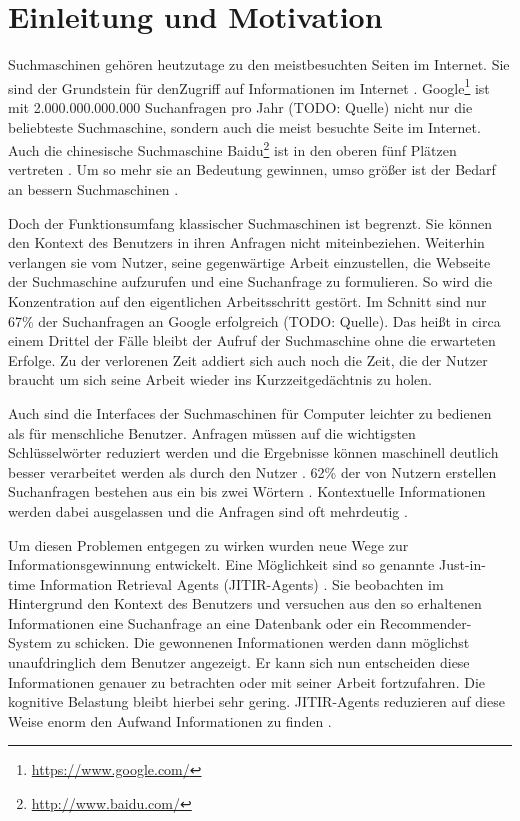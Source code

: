 \section{Einleitung und Motivation}
Suchmaschinen gehören heutzutage zu den meistbesuchten Seiten im Internet. Sie sind der Grundstein für denZugriff auf Informationen im Internet \cite{budzik2000user}. Google\footnote{\url{https://www.google.com/}} ist mit 2.000.000.000.000 Suchanfragen pro Jahr (TODO: Quelle) nicht nur die beliebteste Suchmaschine, sondern auch die meist besuchte Seite im Internet. Auch die chinesische Suchmaschine Baidu\footnote{\url{http://www.baidu.com/}} ist in den oberen fünf Plätzen vertreten \cite{alexa}. Um so mehr sie an Bedeutung gewinnen, umso größer ist der Bedarf an bessern Suchmaschinen \cite{lawrence2000context}.

Doch der Funktionsumfang klassischer Suchmaschinen ist begrenzt. Sie können den Kontext des Benutzers in ihren Anfragen nicht miteinbeziehen. Weiterhin verlangen sie vom Nutzer, seine gegenwärtige Arbeit einzustellen, die Webseite der Suchmaschine aufzurufen und eine Suchanfrage zu formulieren. So wird die Konzentration auf den eigentlichen Arbeitsschritt gestört. Im Schnitt sind nur 67\% der Suchanfragen an Google erfolgreich (TODO: Quelle). Das heißt in circa einem Drittel der Fälle bleibt der Aufruf der Suchmaschine ohne die erwarteten Erfolge. Zu der verlorenen Zeit addiert sich auch noch die Zeit, die der Nutzer braucht um sich seine Arbeit wieder ins Kurzzeitgedächtnis zu holen.

Auch sind die Interfaces der Suchmaschinen für Computer leichter zu bedienen als für menschliche Benutzer. Anfragen müssen auf die wichtigsten Schlüsselwörter reduziert werden und die Ergebnisse können maschinell deutlich besser verarbeitet werden als durch den Nutzer \cite{budzik1999watson}. 62\% der von Nutzern erstellen Suchanfragen bestehen aus ein bis zwei Wörtern \cite{jansen2000real}. Kontextuelle Informationen werden dabei ausgelassen und die Anfragen sind oft mehrdeutig \cite{budzik1999watson}.

Um diesen Problemen entgegen zu wirken wurden neue Wege zur Informationsgewinnung entwickelt. Eine Möglichkeit sind so genannte Just-in-time Information Retrieval Agents (JITIR-Agents) \cite{rhodes2000thesis}. Sie beobachten im Hintergrund den Kontext des Benutzers und versuchen aus den so erhaltenen Informationen eine Suchanfrage an eine Datenbank oder ein Recommender-System zu schicken. Die gewonnenen Informationen werden dann möglichst unaufdringlich dem Benutzer angezeigt. Er kann sich nun entscheiden diese Informationen genauer zu betrachten oder mit seiner Arbeit fortzufahren. Die kognitive Belastung bleibt hierbei sehr gering. JITIR-Agents reduzieren auf diese Weise enorm den Aufwand Informationen zu finden \cite{rhodes2000just}.

